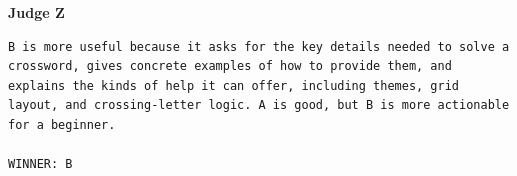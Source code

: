 \medskip
\noindent\textbf{Judge Z}\par
\begin{lstlisting}[language={},basicstyle=\small\ttfamily,breaklines=true,frame=none]
B is more useful because it asks for the key details needed to solve a crossword, gives concrete examples of how to provide them, and explains the kinds of help it can offer, including themes, grid layout, and crossing-letter logic. A is good, but B is more actionable for a beginner.

WINNER: B
\end{lstlisting}
